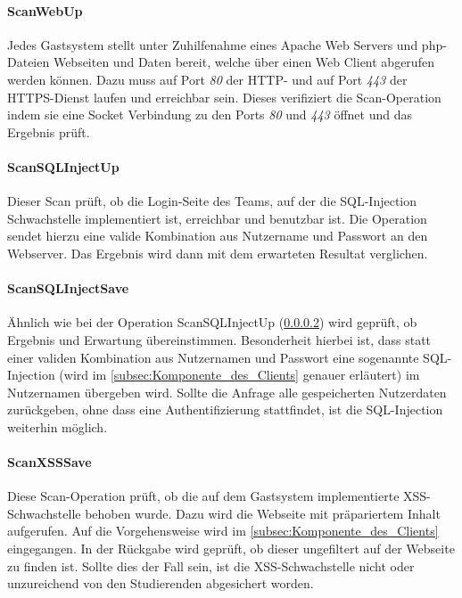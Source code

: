 \paragraph{ScanWebUp}\label{para:ScanWebUp}
Jedes Gastsystem stellt unter Zuhilfenahme eines Apache Web Servers und php-Dateien Webseiten und Daten bereit, welche über einen Web Client abgerufen werden können. Dazu muss auf Port \textit{80} der HTTP- und auf Port \textit{443} der HTTPS-Dienst laufen und erreichbar sein. Dieses verifiziert die Scan-Operation indem sie eine Socket Verbindung zu den Ports \textit{80} und \textit{443} öffnet und das Ergebnis prüft.

\paragraph{ScanSQLInjectUp}\label{para:ScanSQLInjectUp}
Dieser Scan prüft, ob die Login-Seite des Teams, auf der die SQL-Injection Schwachstelle implementiert ist, erreichbar und benutzbar ist. Die Operation sendet hierzu eine valide Kombination aus Nutzername und Passwort an den Webserver. Das Ergebnis wird dann mit dem erwarteten Resultat verglichen.

\paragraph{ScanSQLInjectSave}\label{para:ScanSQLInjectSave}
Ähnlich wie bei der Operation ScanSQLInjectUp (\ref{para:ScanSQLInjectUp}) wird geprüft, ob Ergebnis und Erwartung übereinstimmen. Besonderheit hierbei ist, dass statt einer validen Kombination aus Nutzernamen und Passwort eine sogenannte SQL-Injection (wird im \autoref{subsec:Komponente_des_Clients} genauer erläutert) im Nutzernamen übergeben wird.  
Sollte die Anfrage alle gespeicherten Nutzerdaten zurückgeben, ohne dass eine Authentifizierung stattfindet, ist die SQL-Injection weiterhin möglich.

\paragraph{ScanXSSSave}\label{para:ScanXSSSave}
Diese Scan-Operation prüft, ob die auf dem Gastsystem implementierte XSS-Schwachstelle behoben wurde. Dazu wird die Webseite mit präpariertem Inhalt aufgerufen. Auf die Vorgehensweise wird im \autoref{subsec:Komponente_des_Clients} eingegangen.
In der Rückgabe wird geprüft, ob dieser ungefiltert auf der Webseite zu finden ist. Sollte dies der Fall sein, ist die XSS-Schwachstelle nicht oder unzureichend von den Studierenden abgesichert worden.

